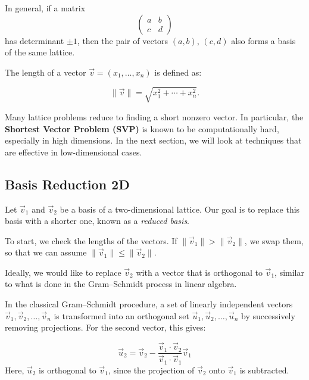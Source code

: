 \documentclass[a4paper,12pt]{article}
\begin{document}
In general, if a matrix
\[
\begin{pmatrix}
a & b \\
c & d
\end{pmatrix}
\]
has determinant \( \pm 1 \), then the pair of vectors \( (a, b) \), \( (c, d) \) also forms a basis of the same lattice.

\vspace{1em}
The length of a vector \( \vec{v} = (x_1, \ldots, x_n) \) is defined as:

\[
\| \vec{v} \| = \sqrt{x_1^2 + \cdots + x_n^2}.
\]

Many lattice problems reduce to finding a short nonzero vector.  
In particular, the \textbf{Shortest Vector Problem (SVP)} is known to be computationally hard,  
especially in high dimensions. In the next section, we will look at techniques that are effective in low-dimensional cases.

\subsection{Basis Reduction 2D}
Let \( \vec{v}_1 \) and \( \vec{v}_2 \) be a basis of a two-dimensional lattice.  
Our goal is to replace this basis with a shorter one, known as a \textit{reduced basis}.

To start, we check the lengths of the vectors. If \( \|\vec{v}_1\| > \|\vec{v}_2\| \), we swap them,  
so that we can assume \( \|\vec{v}_1\| \leq \|\vec{v}_2\| \).

Ideally, we would like to replace \( \vec{v}_2 \) with a vector that is orthogonal to \( \vec{v}_1 \),  
similar to what is done in the Gram–Schmidt process in linear algebra.

In the classical Gram–Schmidt procedure, a set of linearly independent vectors  
\( \vec{v}_1, \vec{v}_2, \ldots, \vec{v}_n \) is transformed into an orthogonal set  
\( \vec{u}_1, \vec{u}_2, \ldots, \vec{u}_n \) by successively removing projections.  
For the second vector, this gives:

\[
\vec{u}_2 = \vec{v}_2 - \frac{\vec{v}_1 \cdot \vec{v}_2}{\vec{v}_1 \cdot \vec{v}_1} \vec{v}_1
\]
Here, \( \vec{u}_2 \) is orthogonal to \( \vec{v}_1 \), since the projection of \( \vec{v}_2 \) onto \( \vec{v}_1 \)  
is subtracted.
\end{document}
